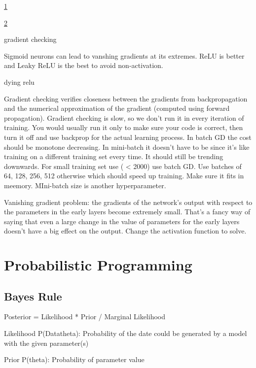 \documentclass[]{book}
\begin{document}
\href{http://theorangeduck.com/page/neural-network-not-working}{1}

\href{https://towardsdatascience.com/checklist-for-debugging-neural-networks-d8b2a9434f21}{2}

gradient checking

Sigmoid neurons can lead to vanshing gradients at its extremes. ReLU is better and Leaky ReLU is the best to avoid non-activation.

dying relu

Gradient checking verifies closeness between the gradients from backpropagation and the numerical approximation of the gradient (computed using forward propagation). Gradient checking is slow, so we don't run it in every iteration of training. You would usually run it only to make sure your code is correct, then turn it off and use backprop for the actual learning process. In batch GD the cost should be monotone decreasing. In mini-batch it doesn't have to be since it's like training on a different training set every time. It should still be trending downwards. For small training set use ( \textless{} 2000) use batch GD. Use batches of 64, 128, 256, 512 otherwise which should speed up training. Make sure it fits in meemory. MIni-batch size is another hyperparameter.

Vanishing gradient problem: the gradients of the network's output with respect to the parameters in the early layers become extremely small. That's a fancy way of saying that even a large change in the value of parameters for the early layers doesn't have a big effect on the output. Change the activation function to solve.

\hypertarget{probabilistic-programming}{%
\chapter{Probabilistic Programming}\label{probabilistic-programming}}

\hypertarget{bayes-rule}{%
\section{Bayes Rule}\label{bayes-rule}}

Posterior = Likelihood * Prior / Marginal Likelihood

Likelihood P(Data\textbar{}theta): Probability of the date could be generated by a model with the given parameter(s)

Prior P(theta): Probability of parameter value
\end{document}
